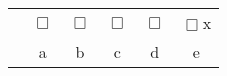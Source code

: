 \begin{center}
\begin{tabular}{c c c c c c}
& $\Box$ & $\Box$  & $\Box$   & $\Box$   & $\Box$\hspace{-0.25cm}x   \\
& a & b  & c  & d  & e \\
\end{tabular}
\end{center}

